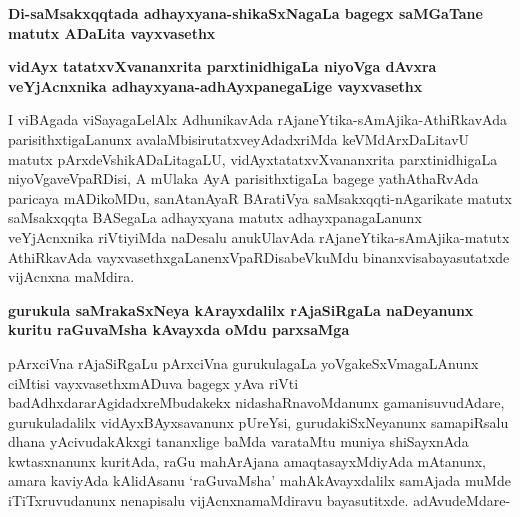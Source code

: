 \noindent
\textbf{Di-saMsakxqqtada adhayxyana-shikaSxNagaLa bagegx saMGaTane matutx ADaLita vayxvasethx}

\noindent
\textbf{vidAyx tatatxvXvananxrita parxtinidhigaLa niyoVga dAvxra veYjAcnxnika adhayxyana-adhAyxpanegaLige vayxvasethx}

I viBAgada viSayagaLelAlx AdhunikavAda rAjaneYtika-sAmAjika-AthiRkavAda parisithxtigaLanunx avalaMbisirutatxveyAdadxriMda keVMdArxDaLitavU matutx pArxdeVshikADaLitagaLU, vidAyxtatatxvXvananxrita parxtinidhigaLa niyoVgaveVpaRDisi, A mUlaka AyA parisithxtigaLa bagege yathAthaRvAda paricaya mADikoMDu, sanAtanAyaR BAratiVya saMsakxqqti-nAgarikate matutx saMsakxqqta BASegaLa adhayxyana matutx adhayxpanagaLanunx veYjAcnxnika riVtiyiMda naDesalu anukUlavAda rAjaneYtika-sAmAjika-matutx AthiRkavAda vayxvasethxgaLanenxVpaRDisabeVkuMdu binanxvisabayasutatxde vijAcnxna maMdira.

\noindent
\textbf{gurukula saMrakaSxNeya kArayxdalilx rAjaSiRgaLa naDeyanunx kuritu raGuvaMsha kAvayxda oMdu parxsaMga}\label{page55}

pArxciVna rAjaSiRgaLu pArxciVna gurukulagaLa yoVgakeSxVmagaLAnunx ciMtisi vayxvasethxmADuva bagegx yAva riVti badAdhxdararAgidadxreMbudakekx nidashaRnavoMdanunx gamanisuvudAdare, gurukuladalilx vidAyxBAyxsavanunx pUreYsi, gurudakiSxNeyanunx samapiRsalu dhana yAcivudakAkxgi tananxlige baMda varataMtu
muniya shiSayxnAda kwtasxnanunx kuritAda, raGu mahArAjana amaqtasayxMdiyAda mAtanunx, amara kaviyAda kAlidAsanu `raGuvaMsha' mahAkAvayxdalilx samAjada muMde iTiTxruvudanunx nenapisalu vijAcnxnamaMdiravu bayasutitxde. adAvudeMdare-

